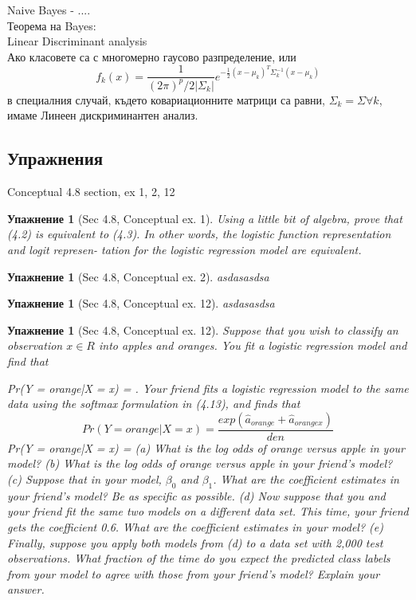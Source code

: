 \documentclass{article}
\newtheorem{exercise}[subsubsection]{Упажнение}
\begin{document}
	Naive Bayes - .... \\
	Теорема на Bayes: \\
	Linear Discriminant analysis \\
	Ако класовете са с многомерно гаусово разпределение, или
	$$f_k(x) = \frac{1}{(2\pi)^p/2 \left | \Sigma_k  \right |} e^{-\frac{1}{2} (x-\mu_k)^T \Sigma_k^{-1}(x-\mu_k)} $$
	в специалния случай, където ковариационните матрици са равни, $\Sigma_k = \Sigma \forall k$, имаме 
	Линеен дискриминантен анализ.
	
	
	\subsection{Упражнения}
	Conceptual 4.8 section, ex 1, 2, 12 \\

	\begin{exercise}[Sec 4.8, Conceptual ex. 1]
			Using a little bit of algebra, prove that (4.2) is equivalent to (4.3). In
		other words, the logistic function representation and logit represen-
		tation for the logistic regression model are equivalent.
	\end{exercise}

	\begin{exercise}[Sec 4.8, Conceptual ex. 2]
		asdasasdsa
	\end{exercise}

	\begin{exercise}[Sec 4.8, Conceptual ex. 12]
		asdasasdsa
	\end{exercise}

	\begin{exercise}[Sec 4.8, Conceptual ex. 12]
	Suppose that you wish to classify an observation $x \in R $ into apples
	and oranges. You fit a logistic regression model and find that
	
	Pr(Y = orange|X = x) =
	.
	Your friend fits a logistic regression model to the same data using the
	softmax formulation in (4.13), and finds that
	$$Pr(Y= orange| X=x) = \frac{exp(\hat{a}_{orange} + \hat{a}_{orangex}) }{den}$$
	Pr(Y = orange|X = x) =
	(a) What is the log odds of orange versus apple in your model?
	(b) What is the log odds of orange versus apple in your friend’s
	model?
	(c) Suppose that in your model, $\beta_0$ and $\beta_1$. What are
	the coefficient estimates in your friend’s model? Be as specific
	as possible.
	(d) Now suppose that you and your friend fit the same two models
	on a different data set. This time, your friend gets the coefficient
	0.6. What are the coefficient estimates in your model?
	(e) Finally, suppose you apply both models from (d) to a data set
	with 2,000 test observations. What fraction of the time do you
	expect the predicted class labels from your model to agree with
	those from your friend’s model? Explain your answer. \\
	\end{exercise}
\end{document}
